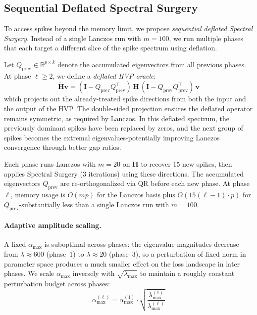 \documentclass[11pt,a4paper]{article}
\newcommand{\R}{\mathbb{R}}
\newcommand{\mat}[1]{\bm{#1}}
\newcommand{\vect}[1]{\bm{#1}}
\newcommand{\Hess}{\mat{H}}
\begin{document}
\subsection{Sequential Deflated Spectral Surgery}

To access spikes beyond the memory limit, we propose
\emph{sequential deflated Spectral Surgery}. Instead of a single
Lanczos run with $m = 100$, we run multiple phases that each target a
different slice of the spike spectrum using deflation.

Let $Q_{\mathrm{prev}} \in \R^{p \times k}$ denote the accumulated
eigenvectors from all previous phases. At phase $\ell \geq 2$, we
define a \emph{deflated HVP oracle}:
\begin{equation}
\widetilde{\Hess}\vect{v}
  = (\mat{I} - Q_{\mathrm{prev}} Q_{\mathrm{prev}}^\top)\,
    \Hess\,
    (\mat{I} - Q_{\mathrm{prev}} Q_{\mathrm{prev}}^\top)\,
    \vect{v}
\label{eq:deflated-hvp}
\end{equation}
which projects out the already-treated spike directions from both the
input and the output of the HVP. The double-sided projection ensures
the deflated operator remains symmetric, as required by Lanczos. In
this deflated spectrum, the previously dominant spikes have been
replaced by zeros, and the next group of spikes becomes the extremal
eigenvalues-potentially improving Lanczos convergence through better
gap ratios.

Each phase runs Lanczos with $m = 20$ on $\widetilde{\Hess}$ to
recover 15 new spikes, then applies Spectral Surgery (3 iterations)
using these directions. The accumulated eigenvectors
$Q_{\mathrm{prev}}$ are re-orthogonalized via QR before each new
phase. At phase $\ell$, memory usage is $O(mp)$ for the Lanczos basis
plus $O(15(\ell{-}1) \cdot p)$ for $Q_{\mathrm{prev}}$-substantially
less than a single Lanczos run with $m = 100$.

\paragraph{Adaptive amplitude scaling.}
A fixed $\alpha_{\max}$ is suboptimal across phases: the eigenvalue
magnitudes decrease from $\lambda \approx 600$ (phase~1) to
$\lambda \approx 20$ (phase~3), so a perturbation of fixed norm in
parameter space produces a much smaller effect on the loss landscape
in later phases. We scale $\alpha_{\max}$ inversely with
$\sqrt{\lambda_{\max}}$ to maintain a roughly constant perturbation
budget across phases:
\begin{equation}
\alpha_{\max}^{(\ell)} = \alpha_{\max}^{(1)} \cdot
  \sqrt{\frac{\lambda_{\max}^{(1)}}{\lambda_{\max}^{(\ell)}}}
\label{eq:adaptive-alpha}
\end{equation}
\end{document}
